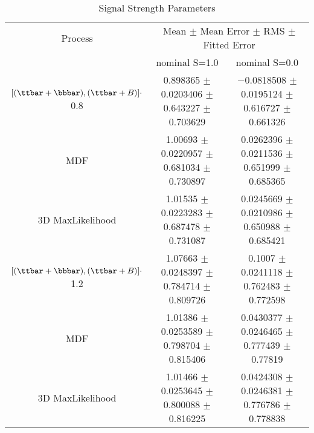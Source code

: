 \begin{table}
\centering
\caption{Signal Strength Parameters}
\begin{tabular}{ccc}
\toprule
Process & \multicolumn{2}{c}{Mean $\pm$ Mean Error $\pm$ RMS $\pm$ Fitted Error}\\
 & nominal S=1.0 & nominal S=0.0\\
\midrule
$[(\ttbar + \bbbar),(\ttbar + B)] \cdot$ 0.8 & \num{0.898365} $\pm$ \num{0.0203406} $\pm$ \num{0.643227} $\pm$ \num{0.703629} & \num{-0.0818508} $\pm$ \num{0.0195124} $\pm$ \num{0.616727} $\pm$ \num{0.661326}\\
MDF & \num{1.00693} $\pm$ \num{0.0220957} $\pm$ \num{0.681034} $\pm$ \num{0.730897} & \num{0.0262396} $\pm$ \num{0.0211536} $\pm$ \num{0.651999} $\pm$ \num{0.685365}\\
3D MaxLikelihood& \num{1.01535} $\pm$ \num{0.0223283} $\pm$ \num{0.687478} $\pm$ \num{0.731087} & \num{0.0245669} $\pm$ \num{0.0210986} $\pm$ \num{0.650988} $\pm$ \num{0.685421}\\
$[(\ttbar + \bbbar),(\ttbar + B)] \cdot$ 1.2 & \num{1.07663} $\pm$ \num{0.0248397} $\pm$ \num{0.784714} $\pm$ \num{0.809726} & \num{0.1007} $\pm$ \num{0.0241118} $\pm$ \num{0.762483} $\pm$ \num{0.772598}\\
MDF & \num{1.01386} $\pm$ \num{0.0253589} $\pm$ \num{0.798704} $\pm$ \num{0.815406} & \num{0.0430377} $\pm$ \num{0.0246465} $\pm$ \num{0.777439} $\pm$ \num{0.77819}\\
3D MaxLikelihood & \num{1.01466} $\pm$ \num{0.0253645} $\pm$ \num{0.800088} $\pm$ \num{0.816225} & \num{0.0424308} $\pm$ \num{0.0246381} $\pm$ \num{0.776786} $\pm$ \num{0.778838}\\
\bottomrule
\end{tabular}
\end{table}